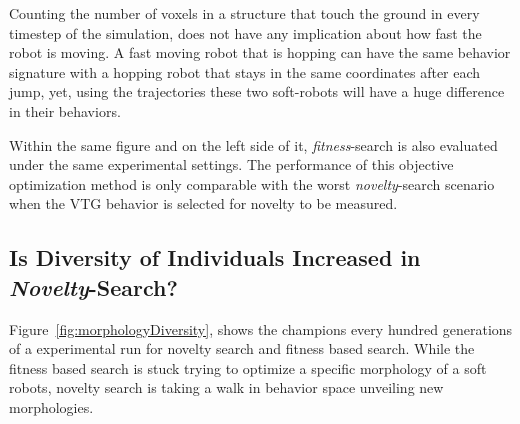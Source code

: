 Counting the number of voxels in a structure that touch the ground in every timestep of the simulation, does not have any implication about how fast the robot is moving. A fast moving robot that is hopping can have the same behavior signature with a hopping robot that stays in the same coordinates after each jump, yet, using the trajectories these two soft-robots will have a huge difference in their behaviors.

Within the same figure and on the left side of it, \emph{fitness}-search is also evaluated under the same experimental settings. The performance of this objective optimization method is only comparable with the worst \emph{novelty}-search scenario when the VTG behavior is selected for novelty to be measured.

\subsection{Is Diversity of Individuals Increased in \emph{Novelty}-Search?}

Figure~\ref{fig:morphologyDiversity}, shows the champions every hundred generations of a experimental run for novelty search and fitness based search. While the fitness based search is stuck trying to optimize a specific morphology of a soft robots, novelty search is taking a walk in behavior space unveiling new morphologies. 

